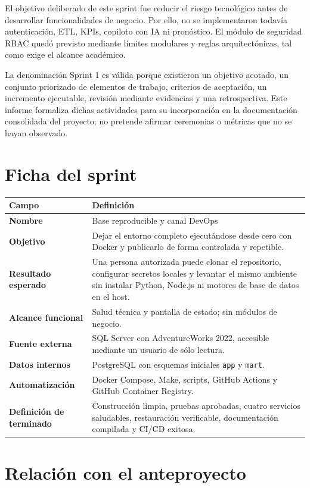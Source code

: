 \documentclass[11pt,letterpaper]{article}
\newcommand{\file}[1]{\texttt{#1}}
\begin{document}
El objetivo deliberado de este sprint fue reducir el riesgo tecnológico antes de desarrollar funcionalidades de negocio. Por ello, no se implementaron todavía autenticación, ETL, KPIs, copiloto con IA ni pronóstico. El módulo de seguridad RBAC quedó previsto mediante límites modulares y reglas arquitectónicas, tal como exige el alcance académico.

La denominación Sprint 1 es válida porque existieron un objetivo acotado, un conjunto priorizado de elementos de trabajo, criterios de aceptación, un incremento ejecutable, revisión mediante evidencias y una retrospectiva. Este informe formaliza dichas actividades para su incorporación en la documentación consolidada del proyecto; no pretende afirmar ceremonias o métricas que no se hayan observado.

\section{Ficha del sprint}

\begin{tabularx}{\textwidth}{@{}>{\bfseries}p{}X@{}}
  \toprule
  Campo & Definición \\
  \midrule
  Nombre & Base reproducible y canal DevOps \\
  Objetivo & Dejar el entorno completo ejecutándose desde cero con Docker y publicarlo de forma controlada y repetible. \\
  Resultado esperado & Una persona autorizada puede clonar el repositorio, configurar secretos locales y levantar el mismo ambiente sin instalar Python, Node.js ni motores de base de datos en el host. \\
  Alcance funcional & Salud técnica y pantalla de estado; sin módulos de negocio. \\
  Fuente externa & SQL Server con AdventureWorks 2022, accesible mediante un usuario de sólo lectura. \\
  Datos internos & PostgreSQL con esquemas iniciales \file{app} y \file{mart}. \\
  Automatización & Docker Compose, Make, scripts, GitHub Actions y GitHub Container Registry. \\
  Definición de terminado & Construcción limpia, pruebas aprobadas, cuatro servicios saludables, restauración verificable, documentación compilada y CI/CD exitosa. \\
  \bottomrule
\end{tabularx}

\section{Relación con el anteproyecto}
\end{document}
